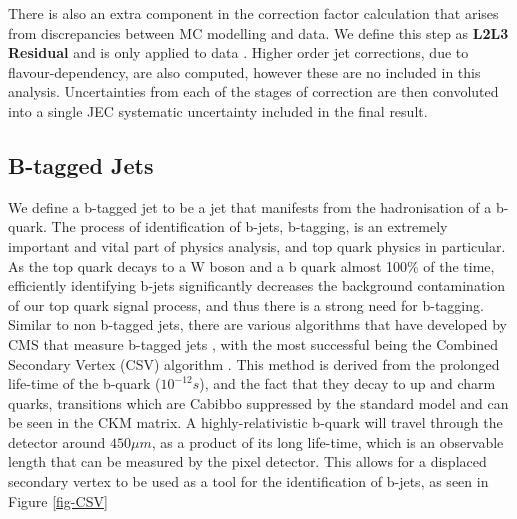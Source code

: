 There is also an extra component in the correction factor calculation that arises from discrepancies between MC modelling and data. We define this step as \textbf{L2L3 Residual} and is only applied to data \cite{1748-0221-6-11-P11002}. Higher order jet corrections, due to flavour-dependency, are also computed, however these are no included in this analysis. Uncertainties from each of the stages of correction are then convoluted into a single JEC systematic uncertainty included in the final result.  

\subsection{B-tagged Jets} \label{subsec-btaggedJets}

We define a b-tagged jet to be a jet that manifests from the hadronisation of a b-quark. The process of identification of b-jets, b-tagging, is an extremely important and vital part of physics analysis, and top quark physics in particular. As the top quark decays to a W boson and a b quark almost 100\% of the time, efficiently identifying b-jets significantly decreases the background contamination of our top quark signal process, and thus there is a strong need for b-tagging. Similar to non b-tagged jets, there are various algorithms that have developed by CMS that measure b-tagged jets \cite{Chatrchyan:2012jua}, with the most successful being the Combined Secondary Vertex (CSV) algorithm \cite{CSV}. This method is derived from the prolonged life-time of the b-quark ($10^{-12}s$), and the fact that they decay to up and charm quarks, transitions which are Cabibbo suppressed by the standard model and can be seen in the CKM matrix. A highly-relativistic b-quark will travel through the detector around $450 \mu m$, as a product of its long life-time, which is an observable length that can be measured by the pixel detector. This allows for a displaced secondary vertex to be used as a tool for the identification of b-jets, as seen in Figure \ref{fig-CSV}

